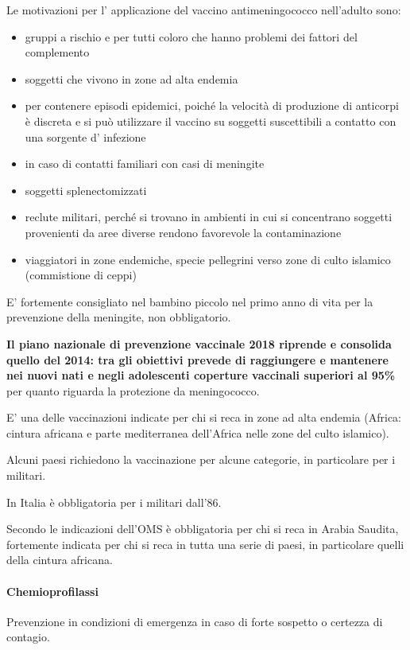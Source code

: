   Le motivazioni per l' applicazione del vaccino antimeningococco
  nell'adulto sono:

\begin{itemize}
\item
  gruppi a rischio e per tutti coloro che hanno problemi dei fattori del
  complemento
\item
  soggetti che vivono in zone ad alta endemia
\item
  per contenere episodi epidemici, poiché la velocità di produzione di
  anticorpi è discreta e si può utilizzare il vaccino su soggetti
  suscettibili a contatto con una sorgente d' infezione
\item
  in caso di contatti familiari con casi di meningite
\item
  soggetti splenectomizzati
\item
  reclute militari, perché si trovano in ambienti in cui si concentrano
  soggetti provenienti da aree diverse rendono favorevole la
  contaminazione
\item
  viaggiatori in zone endemiche, specie pellegrini verso zone di culto
  islamico (commistione di ceppi)
\end{itemize}
  E' fortemente consigliato nel bambino piccolo nel primo anno di vita
  per la prevenzione della meningite, non obbligatorio.

  \textbf{Il piano nazionale di prevenzione vaccinale 2018 riprende e
  consolida quello del 2014: tra gli obiettivi prevede di raggiungere e
  mantenere nei nuovi nati e negli adolescenti coperture vaccinali
  superiori al 95\%} per quanto riguarda la protezione da meningococco.

  E' una delle vaccinazioni indicate per chi si reca in zone ad alta
  endemia (Africa: cintura africana e parte mediterranea dell'Africa
  nelle zone del culto islamico).

  Alcuni paesi richiedono la vaccinazione per alcune categorie, in
  particolare per i militari.

  In Italia è obbligatoria per i militari dall'86.

  Secondo le indicazioni dell'OMS è obbligatoria per chi si reca in
  Arabia Saudita, fortemente indicata per chi si reca in tutta una serie
  di paesi, in particolare quelli della cintura africana.

\paragraph{Chemioprofilassi}
  Prevenzione in condizioni di emergenza in caso di forte sospetto o
  certezza di contagio.

